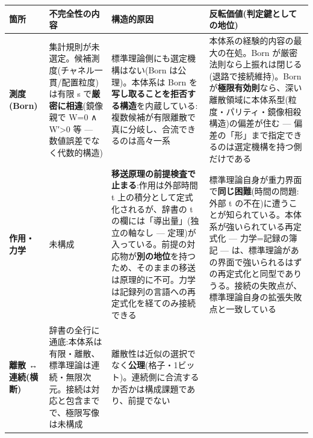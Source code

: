 \documentclass[
]{ltjsarticle}
\newcounter{none} %
\begin{document}
{\def\LTcaptype{none} %
\begin{longtable}[]{@{}
  >{\raggedright\arraybackslash}p{}
  >{\raggedright\arraybackslash}p{}
  >{\raggedright\arraybackslash}p{}
  >{\raggedright\arraybackslash}p{}@{}}
\toprule\noalign{}
\begin{minipage}[b]{\linewidth}\raggedright
箇所
\end{minipage} & \begin{minipage}[b]{\linewidth}\raggedright
不完全性の内容
\end{minipage} & \begin{minipage}[b]{\linewidth}\raggedright
構造的原因
\end{minipage} & \begin{minipage}[b]{\linewidth}\raggedright
反転価値(判定鍵としての地位)
\end{minipage} \\
\midrule\noalign{}
\endhead
\bottomrule\noalign{}
\endlastfoot
\textbf{測度(Born)} &
集計規則が未選定。候補測度(チャネル一貫/配置粒度)は有限 s
で\textbf{厳密に相違}(鏡像親で W=0 ∧ W′\textgreater0 等 ---
数値誤差でなく代数的構造) & 標準理論側にも選定機構はない(Born
は公理)。本体系は Born
を\textbf{写し取ることを拒否する構造}を内蔵している:複数候補が有限離散で真に分岐し、合流できるのは高々一系
& 本体系の経験的内容の最大の在処。Born
が厳密法則なら上振れは閉じる(退路で接続維持)。Born
が\textbf{極限有効則}なら、深い離散領域に本体系型(粒度・パリティ・鏡像相殺構造)の偏差が住む
--- 偏差の「形」まで指定できるのは選定機構を持つ側だけである \\
\textbf{作用・力学} & 未構成 &
\textbf{移送原理の前提検査で止まる}:作用は外部時間 t
上の積分として定式化されるが、辞書の t の欄には「導出量」(独立の軸なし
---
定理)が入っている。前提の対応物が\textbf{別の地位}を持つため、そのままの移送は原理的に不可。力学は記録列の言語への再定式化を経てのみ接続できる
& 標準理論自身が重力界面で\textbf{同じ困難}(時間の問題:外部 t
の不在)に遭うことが知られている。本体系が強いられている再定式化 ---
力学=記録の簿記 ---
は、標準理論があの界面で強いられるはずの再定式化と同型でありうる。接続の失敗点が、標準理論自身の拡張失敗点と一致している \\
\textbf{離散 ↔ 連続(横断)} &
辞書の全行に通底:本体系は有限・離散、標準理論は連続・無限次元。接続は対応と包含までで、極限写像は未構成
&
離散性は近似の選択でなく\textbf{公理}(格子・1ビット)。連続側に合流するか否かは構成課題であり、前提でない

\end{longtable}}
\end{document}
